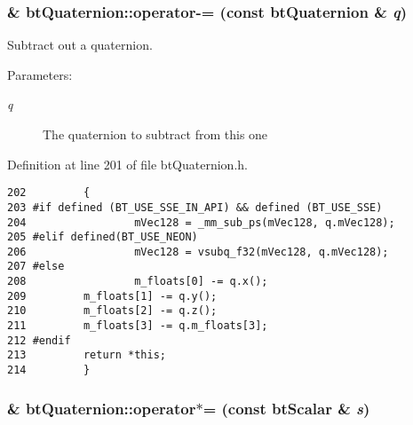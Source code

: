 \hypertarget{classbt_quaternion_c942e70c62d09538e3f6d9c42bc42c5c}{
\subsubsection[operator-=]{\& btQuaternion::operator-= (const {\bf btQuaternion} \& {\em q})}}
\label{classbt_quaternion_c942e70c62d09538e3f6d9c42bc42c5c}


Subtract out a quaternion. 

\begin{Desc}
\item[Parameters:]
\begin{description}
\item[{\em q}]The quaternion to subtract from this one \end{description}
\end{Desc}


Definition at line 201 of file btQuaternion.h.

\begin{Code}\begin{verbatim}202         {
203 #if defined (BT_USE_SSE_IN_API) && defined (BT_USE_SSE)
204                 mVec128 = _mm_sub_ps(mVec128, q.mVec128);
205 #elif defined(BT_USE_NEON)
206                 mVec128 = vsubq_f32(mVec128, q.mVec128);
207 #else   
208                 m_floats[0] -= q.x(); 
209         m_floats[1] -= q.y(); 
210         m_floats[2] -= q.z(); 
211         m_floats[3] -= q.m_floats[3];
212 #endif
213         return *this;
214         }
\end{verbatim}
\end{Code}


\hypertarget{classbt_quaternion_bd260487e98defbd77618f04d51fcc92}{
\subsubsection[operator$\ast$=]{\& btQuaternion::operator$\ast$= (const btScalar \& {\em s})}}
\label{classbt_quaternion_bd260487e98defbd77618f04d51fcc92}


